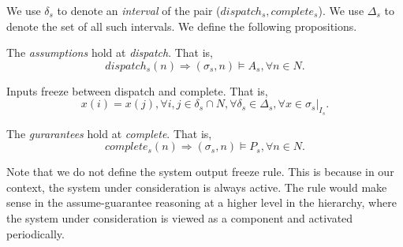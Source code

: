 We use $\delta_s$ to denote an \emph{interval} of the pair ($dispatch_s, complete_s$). We use $\Delta_s$ to denote the set of all such intervals.
We define the following propositions.

The \emph{assumptions} hold at \emph{dispatch}. That is,
\begin{equation} 
\label{eqn:assumption}
	dispatch_s(n) \Rightarrow (\sigma_s, n) \models A_s, \forall n\in N.
\end{equation}

Inputs freeze between dispatch and complete. That is,
\begin{equation} 
\label{eqn:inputfreeze}
	x(i) = x(j), \forall i,j\in \delta_s \cap N, \forall \delta_s \in \Delta_s, \forall x \in \sigma_s|_{I_s}.
\end{equation}

The \emph{gurarantees} hold at \emph{complete}. That is,
\begin{equation} 
\label{eqn:guarantee}
	complete_s(n) \Rightarrow (\sigma_s, n) \models P_s, \forall n\in N.
\end{equation}

Note that we do not define the system output freeze rule. This is because in our context, the system under consideration is always active. The rule would make sense in the assume-guarantee reasoning at a higher level in the hierarchy, where the system under consideration is viewed as a component and activated periodically.
